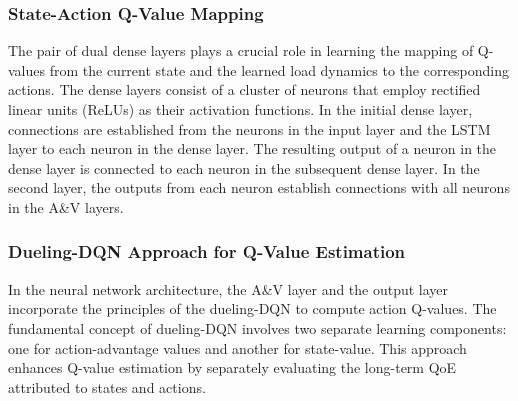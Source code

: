 \documentclass[10pt, journal,letterpaper]{IEEEtran}
\begin{document}
%



\subsubsection{State-Action Q-Value Mapping}
The pair of dual dense layers plays a crucial role in learning the mapping of Q-values from the current state and the learned load dynamics to the corresponding actions. The dense layers consist of a cluster of neurons that employ rectified linear units (ReLUs) as their activation functions. In the initial dense layer, connections are established from the neurons in the input layer and the LSTM layer to each neuron in the dense layer. The resulting output of a neuron in the dense layer is connected to each neuron in the subsequent dense layer. In the second layer, the outputs from each neuron establish connections with all neurons in the A\&V layers.



\subsubsection{Dueling-DQN Approach for Q-Value Estimation}
In the neural network architecture, the A\&V layer and the output layer incorporate the principles of the dueling-DQN \cite{wang2016dueling} to compute action Q-values. The fundamental concept of dueling-DQN involves two separate learning components: one for action-advantage values and another for state-value. This approach enhances Q-value estimation by separately evaluating the long-term QoE attributed to states and actions.
\end{document}

